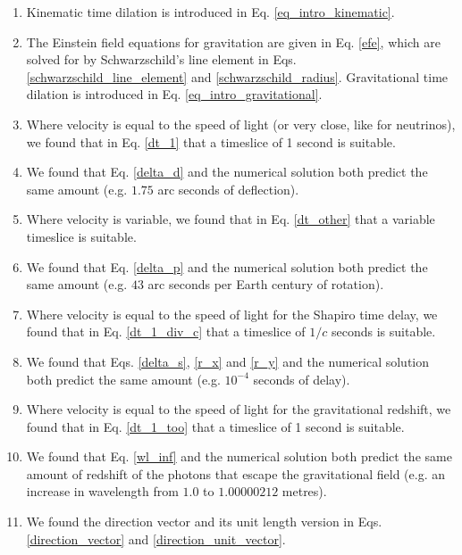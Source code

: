 \documentclass[12pt]{article}
\begin{document}
\begin{enumerate}


\item
Kinematic time dilation is introduced in Eq. \ref{eq_intro_kinematic}.

\item
The Einstein field equations for gravitation are given in Eq. \ref{efe}, which are solved for by Schwarzschild's line element in Eqs. \ref{schwarzschild_line_element} and \ref{schwarzschild_radius}.
Gravitational time dilation is introduced in Eq. \ref{eq_intro_gravitational}.

\item
Where velocity is equal to the speed of light (or very close, like for neutrinos), we found that in Eq. \ref{dt_1} that a timeslice of 1 second is suitable.

\item
We found that Eq. \ref{delta_d} and the numerical solution both predict the same amount (e.g. $1.75$ arc seconds of deflection).

\item
Where velocity is variable, we found that in Eq. \ref{dt_other} that a variable timeslice is suitable.

\item
We found that Eq. \ref{delta_p} and the numerical solution both predict the same amount (e.g. $43$ arc seconds per Earth century of rotation).

\item
Where velocity is equal to the speed of light for the Shapiro time delay, we found that in Eq. \ref{dt_1_div_c} that a timeslice of $1/c$ seconds is suitable.

\item 
We found that Eqs. \ref{delta_s}, \ref{r_x} and \ref{r_y} and the numerical solution both predict the same amount (e.g. $10^{-4}$ seconds of delay).

\item
Where velocity is equal to the speed of light for the gravitational redshift, we found that in Eq. \ref{dt_1_too} that a timeslice of 1 second is suitable.

\item
We found that Eq. \ref{wl_inf} and the numerical solution both predict the same amount of redshift of the photons that escape the gravitational field (e.g. an increase in wavelength from $1.0$ to $1.00000212$ metres).

\item
We found the direction vector and its unit length version in Eqs. \ref{direction_vector} and \ref{direction_unit_vector}.


\end{enumerate}
\end{document}
